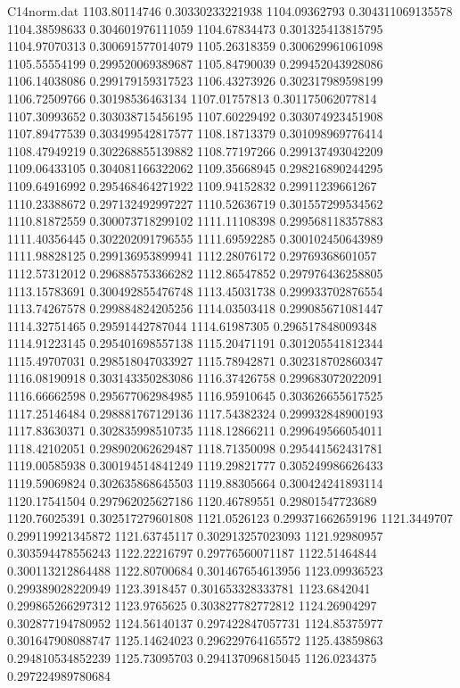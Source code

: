 \begin{filecontents}{C14norm.dat}
1103.80114746			0.30330233221938
1104.09362793			0.304311069135578
1104.38598633			0.304601976111059
1104.67834473			0.301325413815795
1104.97070313			0.300691577014079
1105.26318359			0.300629961061098
1105.55554199			0.299520069389687
1105.84790039			0.299452043928086
1106.14038086			0.299179159317523
1106.43273926			0.302317989598199
1106.72509766			0.30198536463134
1107.01757813			0.301175062077814
1107.30993652			0.303038715456195
1107.60229492			0.303074923451908
1107.89477539			0.303499542817577
1108.18713379			0.301098969776414
1108.47949219			0.302268855139882
1108.77197266			0.299137493042209
1109.06433105			0.304081166322062
1109.35668945			0.298216890244295
1109.64916992			0.295468464271922
1109.94152832			0.29911239661267
1110.23388672			0.297132492997227
1110.52636719			0.301557299534562
1110.81872559			0.300073718299102
1111.11108398			0.299568118357883
1111.40356445			0.302202091796555
1111.69592285			0.300102450643989
1111.98828125			0.299136953899941
1112.28076172			0.29769368601057
1112.57312012			0.296885753366282
1112.86547852			0.297976436258805
1113.15783691			0.300492855476748
1113.45031738			0.299933702876554
1113.74267578			0.299884824205256
1114.03503418			0.299085671081447
1114.32751465			0.29591442787044
1114.61987305			0.296517848009348
1114.91223145			0.295401698557138
1115.20471191			0.301205541812344
1115.49707031			0.298518047033927
1115.78942871			0.302318702860347
1116.08190918			0.303143350283086
1116.37426758			0.299683072022091
1116.66662598			0.295677062984985
1116.95910645			0.303626655617525
1117.25146484			0.298881767129136
1117.54382324			0.299932848900193
1117.83630371			0.302835998510735
1118.12866211			0.299649566054011
1118.42102051			0.298902062629487
1118.71350098			0.295441562431781
1119.00585938			0.300194514841249
1119.29821777			0.305249986626433
1119.59069824			0.302635868645503
1119.88305664			0.300424241893114
1120.17541504			0.297962025627186
1120.46789551			0.29801547723689
1120.76025391			0.302517279601808
1121.0526123			0.299371662659196
1121.3449707			0.299119921345872
1121.63745117			0.302913257023093
1121.92980957			0.303594478556243
1122.22216797			0.29776560071187
1122.51464844			0.300113212864488
1122.80700684			0.301467654613956
1123.09936523			0.299389028220949
1123.3918457			0.301653328333781
1123.6842041			0.299865266297312
1123.9765625			0.303827782772812
1124.26904297			0.302877194780952
1124.56140137			0.297422847057731
1124.85375977			0.301647908088747
1125.14624023			0.296229764165572
1125.43859863			0.294810534852239
1125.73095703			0.294137096815045
1126.0234375			0.297224989780684

\end{filecontents}
